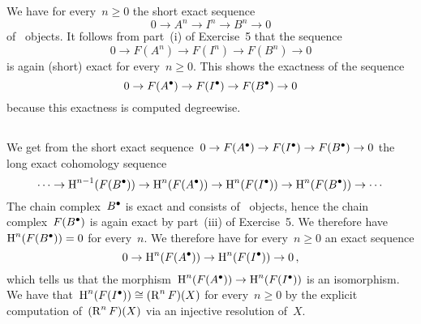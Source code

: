 \subsection{}

We have for every~$n \geq 0$ the short exact sequence
\[
  0
  \to
  A^n
  \to
  I^n
  \to
  B^n
  \to
  0
\]
of~ objects.
It follows from part~(i) of Exercise~5 that the sequence
\[
  0
  \to
  F(A^n)
  \to
  F(I^n)
  \to
  F(B^n)
  \to
  0
\]
is again (short) exact for every~$n \geq 0$.
This shows the exactness of the sequence
\[
  0 
  \to
  F(A^\bullet)
  \to
  F(I^\bullet)
  \to
  F(B^\bullet)
  \to
  0
\]
because this exactness is computed degreewise.





\subsection{}

We get from the short exact sequence~$0 \to F(A^\bullet) \to F(I^\bullet) \to F(B^\bullet) \to 0$ the long exact cohomology sequence
\[
  \dotsb
  \to
  \operatorname{H}^{n-1}(F(B^\bullet))
  \to
  \operatorname{H}^n(F(A^\bullet))
  \to
  \operatorname{H}^n(F(I^\bullet))
  \to
  \operatorname{H}^n(F(B^\bullet))
  \to
  \dotsb
\]
The chain complex~$B^\bullet$ is exact and consists of~ objects, hence the chain complex~$F(B^\bullet)$ is again exact by part~(iii) of Exercise~5.
We therefore have~$\operatorname{H}^n(F(B^\bullet)) = 0$ for every~$n$.
We therefore have for every~$n \geq 0$ an exact sequence
\[
  0
  \to
  \operatorname{H}^n(F(A^\bullet))
  \to
  \operatorname{H}^n(F(I^\bullet))
  \to
  0 \,,
\]
which tells us that the morphism~$\operatorname{H}^n(F(A^\bullet)) \to \operatorname{H}^n(F(I^\bullet))$ is an isomorphism.
We have that~$\operatorname{H}^n(F(I^\bullet)) \cong (\operatorname{R}^n F)(X)$ for every~$n \geq 0$ by the explicit computation of~$(\operatorname{R}^n F)(X)$ via an injective resolution of~$X$.









